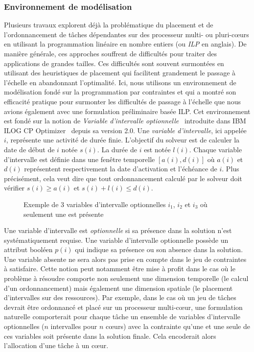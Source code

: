 \documentclass[main.tex]{subfiles}
\begin{document}
\subsubsection{Environnement de modélisation}
Plusieurs travaux explorent déjà la problématique du placement et de l'ordonnancement de tâches dépendantes sur des processeur multi- ou pluri-c\oe{}urs en utilisant la programmation linéaire en nombre entiers (ou \emph{ILP} en anglais). De manière générale, ces approches souffrent de difficultés pour traiter des applications de grandes tailles. Ces difficultés sont souvent surmontées en utilisant des heuristiques de placement qui facilitent grandement le passage à l'échelle en abandonnant l'optimalité. Ici, nous utilisons un environnement de modélisation fondé sur la programmation par contraintes et qui a montré son efficacité pratique pour surmonter les difficultés de passage à l'échelle que nous avions également avec une formulation préliminaire basée ILP. Cet environnement est fondé sur la notion de \emph{Variable d'intervalle optionnelle}~\cite{Laborie08, Laborie09} introduite dans IBM ILOG CP Optimizer~\cite{OPL} depuis sa version 2.0. Une \emph{variable d'intervalle}, ici appelée $i$, représente une activité de durée finie. L'objectif du solveur est de calculer la date de début de $i$ notée $s(i)$. La durée de $i$ est notée $l(i)$. Chaque variable d'intervalle est définie dans une fenêtre temporelle $[ a(i) , d(i) ]$ où $a(i)$ et $d(i)$ représentent respectivement la date d'activation et l'échéance de $i$. Plus précisément, cela veut dire que tout ordonnancement calculé par le solveur doit vérifier $s(i) \geq a(i)$ et $s(i)+l(i) \leq d(i)$. 

\begin{figure}
    \centering
    \scalebox{0.8}{}
    \caption{Exemple de 3 variables d'intervalle optionnelles $i_1$, $i_2$ et $i_3$ où seulement une est présente}
    \label{fig_resumeFr_condTimeInterval}
\end{figure}

Une variable d'intervalle est \emph{optionnelle} si sa présence dans la solution n'est systématiquement requise. Une variable d'intervalle optionnelle possède un attribut booléen $p(i)$ qui indique sa présence ou son absence dans la solution. Une variable absente ne sera alors pas prise en compte dans le jeu de contraintes à satisfaire. Cette notion peut notamment être mise à profit dans le cas où le problème à résoudre comporte non seulement une dimension temporelle (le calcul d'un ordonnancement) mais également une dimension spatiale (le placement d'intervalles sur des ressources). Par exemple, dans le cas où un jeu de tâches devrait être ordonnancé et placé sur un processeur multi-c\oe{}ur, une formulation naturelle comporterait pour chaque tâche un ensemble de variables d'intervalle optionnelles ($n$ intervalles pour $n$ c\oe{}urs) avec la contrainte qu'une et une seule de ces variables soit présente dans la solution finale. Cela encoderait alors l'allocation d'une tâche à un c\oe{}ur.
\end{document}
